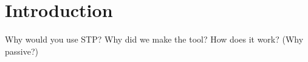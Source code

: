 \chapter{Introduction}
Why would you use STP?
Why did we make the tool?
How does it work?
(Why passive?)

